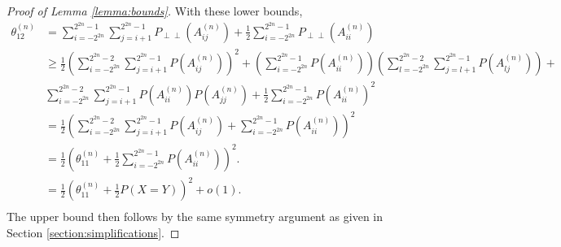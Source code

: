\documentclass[12pt]{article}
\DeclareMathOperator{\AUC}{AUC}
\renewcommand{\P}{P}
\newcommand{\cind}{\perp \!\!\! \perp}
\newcommand{\aucindiv}{\theta_{11}}%
\newcommand{\aucpop}{\theta_{12}}%
\newcommand{\Pind}{P_{\cind}}
\newcommand{\A}[1]{P(A^{(n)}_{#1})}
\begin{document}
\begin{proof}[Proof of Lemma \ref{lemma:bounds}]


    With these lower bounds,
    \begin{align}
    \aucpop^{(n)} &= \sum_{i=-2^{2n}}^{2^{2n}-1}\sum_{j=i+1}^{2^{2n}-1} \Pind(A_{ij}^{(n)})
                    + \frac{1}{2}\sum_{i=-2^{2n}}^{2^{2n}-1} \Pind(A_{ii}^{(n)})\\
                  &\ge \frac{1}{2}\left(\sum_{i=-2^{2n}}^{2^{2n}-2}\sum_{j=i+1}^{2^{2n}-1}\A{ij}\right)^2 +
                    \left(\sum_{i=-2^{2n}}^{2^{2n}-1}\A{ii}\right)
                    \left(\sum_{l=-2^{2n}}^{2^{2n}-2}\sum_{j=l+1}^{2^{2n}-1}\A{lj}\right) +\\
                  &\sum_{i=-2^{2n}}^{2^{2n}-2}\sum_{j=i+1}^{2^{2n}-1} \A{ii}\A{jj}
                    + \frac{1}{2}\sum_{i=-2^{2n}}^{2^{2n}-1} \P(A_{ii}^{(n)})^2\\
                  &= \frac{1}{2}\left(\sum_{i=-2^{2n}}^{2^{2n}-2}\sum_{j=i+1}^{2^{2n}-1}\A{ij} +
                    \sum_{i=-2^{2n}}^{2^{2n}-1} \P(A_{ii}^{(n)})\right)^2\\
      &= \frac{1}{2}\left(\aucindiv^{(n)} +\frac{1}{2}\sum_{i=-2^{2n}}^{2^{2n}-1} \P(A_{ii}^{(n)})\right)^2.\\
      &= \frac{1}{2}\left(\aucindiv^{(n)} +\frac{1}{2}\P(X=Y)\right)^2+o(1).\\
    \end{align}
     The upper bound then follows by the same symmetry argument as given in Section \ref{section:simplifications}.
    
  \end{proof}
\end{document}

